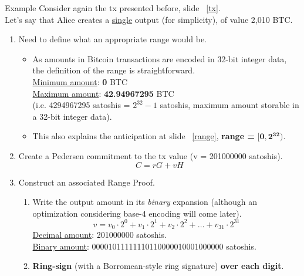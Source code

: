 \documentclass[10.5pt,compress]{beamer}
\begin{document}
\begin{frame}[allowframebreaks]
    \begin{alertblock}{Example} 
        Consider again the tx presented before, slide ~\ref{tx}.\\
        Let's say that Alice creates a \underline{single} output (for simplicity), of value 2,010 BTC.
    \end{alertblock}
    \begin{enumerate}
        \item Need to define what an appropriate range would be.
        \begin{itemize}
            \item As amounts in Bitcoin transactions are encoded in 32-bit integer data, the definition of the range is straightforward.\\
            \underline{Minimum amount}: \textbf{0} BTC\\
            \underline{Maximum amount}: \textbf{42.94967295} BTC \\(i.e. 4294967295 satoshis = $2^{32}-1$ satoshis, maximum amount storable in a 32-bit integer data).
            \item This also explains the anticipation at slide ~\ref{range}, \textbf{range =} $\boldsymbol{[0,2^{32})}$.
        \end{itemize}
        \framebreak
        \item Create a Pedersen commitment to the tx value (v = 201000000 satoshis).
        \begin{equation*}
            C = rG + vH 
        \end{equation*}
        \item Construct an associated Range Proof.
        \begin{enumerate}
            \item Write the output amount in its \textit{binary} expansion (although an optimization considering base-4 encoding will come later).
            \begin{equation*}
                v = v_0\cdot2^0 + v_1\cdot2^1 + v_2\cdot2^2 + \dots + v_{31}\cdot2^{31}
            \end{equation*}
            \underline{Decimal amount}: 201000000 satoshis.\\
            \underline{Binary amount}: 00001011111110110000010001000000 satoshis.
            \framebreak
            \item \textbf{Ring-sign} (with a Borromean-style ring signature) \textbf{over each digit}.

\end{enumerate}
\end{enumerate}
\end{frame}
\end{document}
